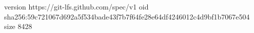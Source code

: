 version https://git-lfs.github.com/spec/v1
oid sha256:59c721067d692a5f534bade43f7b7f64fe28e64df4246012c4d9bf1b7067e504
size 8428
